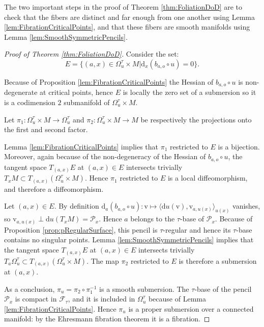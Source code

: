 \documentclass[reqno,10pt]{amsart}
\newcommand{\wip}{\todo[inline]{Unfinished part.}}
\theoremstyle{plain}
\theoremstyle{definition}
\theoremstyle{remark}
\newcommand{\type}{\tau}
\begin{document}
The two important steps in the proof of Theorem \ref{thm:FoliationDoD} are to check that the fibers are distinct and far enough from one another using Lemma \ref{lem:FibrationCriticalPoints}, and that these fibers are smooth manifolds using Lemma \ref{lem:SmoothSymmetricPencils}.

\medskip

\begin{proof}[Proof of Theorem \ref{thm:FoliationDoD}]
Consider the set:
$$E=\lbrace(a,x)\in \Omega^\type_u\times M|\mathrm{d}_x(b_{a,o}\circ u)=0\rbrace.$$

Because of Proposition \ref{lem:FibrationCriticalPoints} the Hessian of $b_{a,o}\circ u$ is non-degenerate at critical points, hence $E$ is locally the zero set of a submersion so it is a codimension $2$ submanifold of $\Omega^\type_u\times M$. 


Let $\pi_1:\Omega^\type_u\times M\to \Omega^\type_u$ and $\pi_2:\Omega^\type_u\times M\to M$ be respectively the projections onto the first and second factor.

\medskip

Lemma \ref{lem:FibrationCriticalPoints} implies that $\pi_1$ restricted to $E$ is a bijection. Moreover, again because of the non-degeneracy of the Hessian of $b_{a,o}\circ u$, the tangent space $T_{(a,x)}E$ at $(a,x)\in E$ intersects trivially $T_xM\subset T_{(a,x)}\left(\Omega^\type_u\times M\right)$. Hence $\pi_1$ restricted to $E$ is a local diffeomorphism, and therefore a diffeomorphism.

\medskip

Let $(a,x)\in E$. By definition $\mathrm{d}_a(b_{a,o}\circ u):\mathrm{v}\mapsto \langle \mathrm{d}u(\mathrm{v}),\mathrm{v}_{a,u(x)} \rangle_{u(x)}$ vanishes, so $\mathrm{v}_{a,u(x)}\perp \mathrm{d}u(T_xM)=\mathcal{P}_x$. Hence $a$ belongs to the $\type$-base of $\mathcal{P}_x$. Because of Proposition \ref{prop:pRegularSurface}, this pencil is $\type$-regular and hence its $\type$-base contains no singular points. Lemma \ref{lem:SmoothSymmetricPencils} implies that the tangent space $T_{(a,x)}E$ at $(a,x)\in E$ intersects trivially $T_a\Omega^\type_u\subset T_{(a,x)}\left(\Omega^\type_u\times M\right)$. The map $\pi_2$ restricted to $E$ is therefore a submersion at $(a,x)$.

\medskip

As a conclusion, $\pi_u=\pi_2\circ  \pi_1^{-1}$ is a smooth submersion. The $\type$-base of the pencil $\mathcal{P}_x$ is compact in $\mathcal{F}_\type$, and it is included in $\Omega^\type_u$ because of Lemma \ref{lem:FibrationCriticalPoints}. Hence $\pi_u$ is a proper submersion over a connected manifold: by the Ehresmann fibration theorem it is a fibration.
\end{proof}
\end{document}
